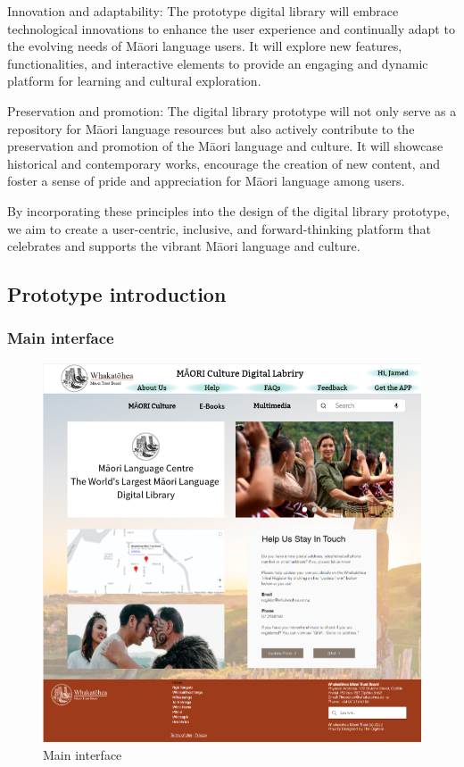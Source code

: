 Innovation and adaptability: The prototype digital library will embrace technological innovations to enhance the user experience and continually adapt to the evolving needs of Māori language users. It will explore new features, functionalities, and interactive elements to provide an engaging and dynamic platform for learning and cultural exploration.

Preservation and promotion: The digital library prototype will not only serve as a repository for Māori language resources but also actively contribute to the preservation and promotion of the Māori language and culture. It will showcase historical and contemporary works, encourage the creation of new content, and foster a sense of pride and appreciation for Māori language among users.

By incorporating these principles into the design of the digital library prototype, we aim to create a user-centric, inclusive, and forward-thinking platform that celebrates and supports the vibrant Māori language and culture.

\subsection{Prototype introduction}

\subsubsection{Main interface}

\begin{figure}[htbp]
  \centerline{\includegraphics[width=400pt]{images/3-1-1.png}}
  \caption{Main interface}
  \label{fig3.1.1}
\end{figure}

